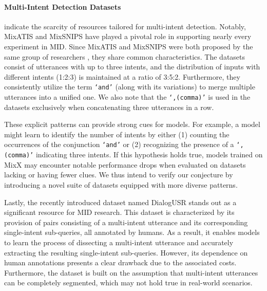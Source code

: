 \paragraph{Multi-Intent Detection Datasets} 
\citet{larson2022survey} indicate the scarcity of resources tailored for multi-intent detection.
Notably, MixATIS and MixSNIPS  have played a pivotal role in supporting nearly every experiment in MID.
Since MixATIS and MixSNIPS were both proposed by the same group of researchers , they share common characteristics.
The datasets consist of utterances with up to three intents, and the distribution of inputs with different intents (1:2:3) is maintained at a ratio of 3:5:2.
Furthermore, they consistently utilize the term \texttt{`and'} (along with its variations) to merge multiple utterances into a unified one.
We also note that the \texttt{`,(comma)'} is used in the datasets exclusively when concatenating three utterances in a row.

These explicit patterns can provide strong cues for models. 
For example, a model might learn to identify the number of intents by either (1) counting the occurrences of the conjunction \texttt{`and'} or (2) recognizing the presence of a \texttt{`,(comma)'} indicating three intents.
If this hypothesis holds true, models trained on MixX may encounter notable performance drops when evaluated on datasets lacking or having fewer clues.
We thus intend to verify our conjecture by introducing a novel suite of datasets equipped with more diverse patterns.

Lastly, the recently introduced dataset named DialogUSR  stands out as a significant resource for MID research.
This dataset is characterized by its provision of pairs consisting of a multi-intent utterance and its corresponding single-intent sub-queries, all annotated by humans.
As a result, it enables models to learn the process of dissecting a multi-intent utterance and accurately extracting the resulting single-intent sub-queries.
However, its dependence on human annotations presents a clear drawback due to the associated costs. 
Furthermore, the dataset is built on the assumption that multi-intent utterances can be completely segmented, which may not hold true in real-world scenarios.